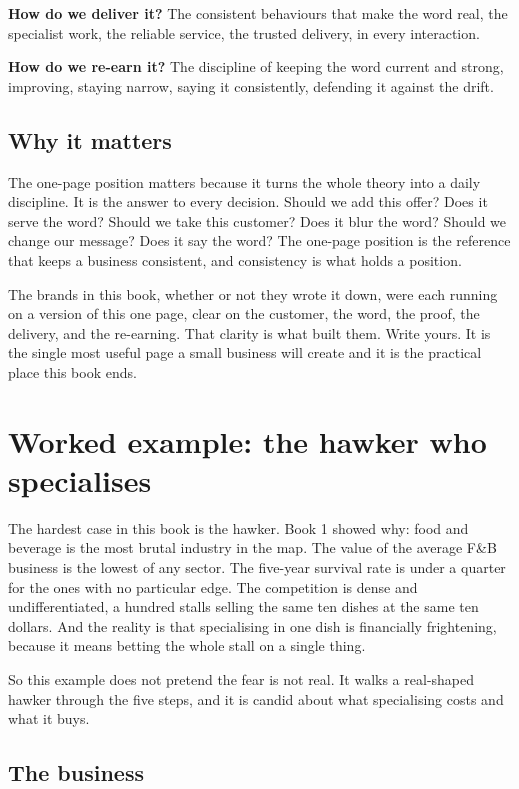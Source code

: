 \documentclass[10pt,twoside,openany]{memoir}
\newcommand{\needspacehead}{\needspace{4\baselineskip}}
\let\oldsection\section
\renewcommand{\section}{\needspacehead\oldsection}
\begin{document}
{\textbf{How do we deliver it?} The consistent behaviours that make the
word real, the specialist work, the reliable service, the trusted
delivery, in every interaction.

\textbf{How do we re-earn it?} The discipline of keeping the word
current and strong, improving, staying narrow, saying it consistently,
defending it against the drift.

\section{Why it matters}\label{why-it-matters}

The one-page position matters because it turns the whole theory into a
daily discipline. It is the answer to every decision. Should we add this
offer? Does it serve the word? Should we take this customer? Does it
blur the word? Should we change our message? Does it say the word? The
one-page position is the reference that keeps a business consistent, and
consistency is what holds a position.

The brands in this book, whether or not they wrote it down, were each
running on a version of this one page, clear on the customer, the word,
the proof, the delivery, and the re-earning. That clarity is what built
them. Write yours. It is the single most useful page a small business
will create and it is the practical place this book ends.

\FloatBarrier
\chapter{Worked example: the hawker who
specialises}\label{worked-example-the-hawker-who-specialises}

The hardest case in this book is the hawker. Book 1 showed why: food and
beverage is the most brutal industry in the map. The value of the
average F\&B business is the lowest of any sector. The five-year
survival rate is under a quarter for the ones with no particular edge.
The competition is dense and undifferentiated, a hundred stalls selling
the same ten dishes at the same ten dollars. And the reality is that
specialising in one dish is financially frightening, because it means
betting the whole stall on a single thing.

So this example does not pretend the fear is not real. It walks a
real-shaped hawker through the five steps, and it is candid about what
specialising costs and what it buys.

\section{The business}\label{the-business-1}

}
\end{document}
